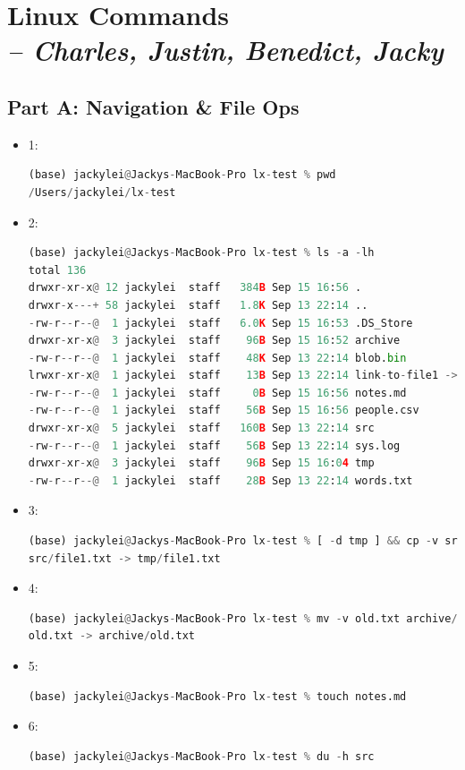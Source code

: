 \chapter{Linux Commands \\
\small{\textit{-- Charles, Justin, Benedict, Jacky}}
\label{Chapter::Linux Commands}}

\section{Part A: Navigation \& File Ops}
\begin{itemize}
    \item 1: 
        \begin{lstlisting}[language=Python]
(base) jackylei@Jackys-MacBook-Pro lx-test % pwd
/Users/jackylei/lx-test
        \end{lstlisting}
    \item 2: 
        \begin{lstlisting}[language=Python]
(base) jackylei@Jackys-MacBook-Pro lx-test % ls -a -lh
total 136
drwxr-xr-x@ 12 jackylei  staff   384B Sep 15 16:56 .
drwxr-x---+ 58 jackylei  staff   1.8K Sep 13 22:14 ..
-rw-r--r--@  1 jackylei  staff   6.0K Sep 15 16:53 .DS_Store
drwxr-xr-x@  3 jackylei  staff    96B Sep 15 16:52 archive
-rw-r--r--@  1 jackylei  staff    48K Sep 13 22:14 blob.bin
lrwxr-xr-x@  1 jackylei  staff    13B Sep 13 22:14 link-to-file1 -> src/file1.txt
-rw-r--r--@  1 jackylei  staff     0B Sep 15 16:56 notes.md
-rw-r--r--@  1 jackylei  staff    56B Sep 15 16:56 people.csv
drwxr-xr-x@  5 jackylei  staff   160B Sep 13 22:14 src
-rw-r--r--@  1 jackylei  staff    56B Sep 13 22:14 sys.log
drwxr-xr-x@  3 jackylei  staff    96B Sep 15 16:04 tmp
-rw-r--r--@  1 jackylei  staff    28B Sep 13 22:14 words.txt
        \end{lstlisting}
    \item 3: 
        \begin{lstlisting}[language=Python]
(base) jackylei@Jackys-MacBook-Pro lx-test % [ -d tmp ] && cp -v src/file1.txt tmp
src/file1.txt -> tmp/file1.txt
        \end{lstlisting}
    \item 4: 
        \begin{lstlisting}[language=Python]
(base) jackylei@Jackys-MacBook-Pro lx-test % mv -v old.txt archive/
old.txt -> archive/old.txt
        \end{lstlisting}
    \item 5: 
        \begin{lstlisting}[language=Python]
(base) jackylei@Jackys-MacBook-Pro lx-test % touch notes.md
        \end{lstlisting}
    \item 6:     
        \begin{lstlisting}[language=Python]
(base) jackylei@Jackys-MacBook-Pro lx-test % du -h src
        \end{lstlisting}
\end{itemize}

